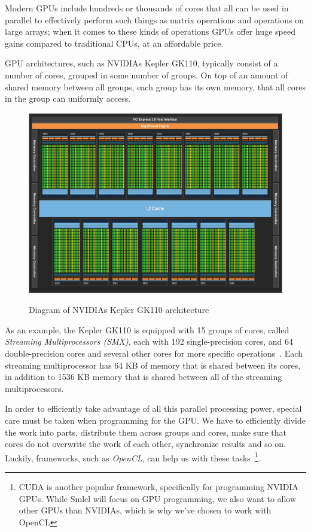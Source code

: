 Modern GPUs include hundreds or thousands of cores that all can be
used in parallel to effectively perform such things as matrix
operations and operations on large arrays; when it comes to these
kinds of operations GPUs offer huge speed gains compared to
traditional CPUs, at an affordable price.

GPU architectures, such as NVIDIAs Kepler GK110, typically consist of
a number of cores, grouped in some number of groups. On top of an
amount of shared memory between all groups, each group has its own
memory, that all cores in the group can uniformly access.

\begin{figure}
  \centering
  \caption{Diagram of NVIDIAs Kepler GK110 architecture}
  \includegraphics[width=1\textwidth]{figures/kepler110.png}
  \label{kepler}
\end{figure}

As an example, the Kepler GK110 is equipped with 15 groups of cores,
called \emph{Streaming Multiprocessors (SMX)}, each with 192
single-precision cores, and 64 double-precision cores and several
other cores for more specific operations~\cite{kepler}. Each streaming
multiprocessor has 64 KB of memory that is shared between its cores,
in addition to 1536 KB memory that is shared between all of the
streaming multiprocessors.

In order to efficiently take advantage of all this parallel processing
power, special care must be taken when programming for the GPU. We
have to efficiently divide the work into parts, distribute them across
groups and cores, make sure that cores do not overwrite the work of
each other, synchronize results and so on. Luckily, frameworks, such
as \emph{OpenCL}, can help us with these tasks~\footnote{CUDA is
  another popular framework, specifically for programming NVIDIA
  GPUs. While Smlcl will focus on GPU programming, we also want to
  allow other GPUs than NVIDIAs, which is why we've chosen to work
  with OpenCL}.

